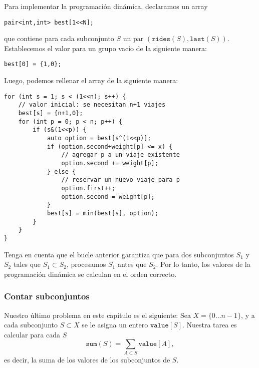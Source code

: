 Para implementar la programación dinámica,
declaramos un array
\begin{lstlisting}
pair<int,int> best[1<<N];
\end{lstlisting}
que contiene para cada subconjunto $S$
un par $(\texttt{rides}(S),\texttt{last}(S))$.
Establecemos el valor para un grupo vacío de la siguiente manera:
\begin{lstlisting}
best[0] = {1,0};
\end{lstlisting}
Luego, podemos rellenar el array de la siguiente manera:

\begin{lstlisting}
for (int s = 1; s < (1<<n); s++) {
    // valor inicial: se necesitan n+1 viajes
    best[s] = {n+1,0};
    for (int p = 0; p < n; p++) {
        if (s&(1<<p)) {
            auto option = best[s^(1<<p)];
            if (option.second+weight[p] <= x) {
                // agregar p a un viaje existente
                option.second += weight[p];
            } else {
                // reservar un nuevo viaje para p
                option.first++;
                option.second = weight[p];
            }
            best[s] = min(best[s], option);
        }
    }
}
\end{lstlisting}
Tenga en cuenta que el bucle anterior garantiza que
para dos subconjuntos $S_1$ y $S_2$
tales que $S_1 \subset S_2$, procesamos $S_1$ antes que $S_2$.
Por lo tanto, los valores de la programación dinámica se calculan en el
orden correcto.

\subsubsection{Contar subconjuntos}

Nuestro último problema en este capítulo es el siguiente:
Sea $X=\{0 \ldots n-1\}$, y a cada subconjunto $S \subset X$
se le asigna un entero $\texttt{value}[S]$.
Nuestra tarea es calcular para cada $S$
\[\texttt{sum}(S) = \sum_{A \subset S} \texttt{value}[A],\]
es decir, la suma de los valores de los subconjuntos de $S$.

